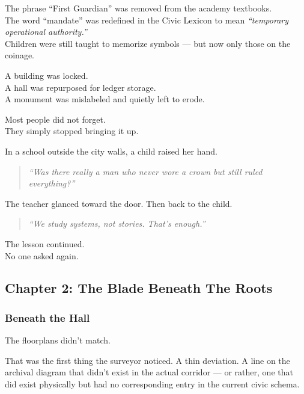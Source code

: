 \documentclass[12pt]{article}
\begin{document}
The phrase ``First Guardian'' was removed from the academy textbooks.\\
The word ``mandate'' was redefined in the Civic Lexicon to mean \textit{“temporary operational authority.”}\\
Children were still taught to memorize symbols --- but now only those on the coinage.

\vspace{1em}

A building was locked.\\
A hall was repurposed for ledger storage.\\
A monument was mislabeled and quietly left to erode.

Most people did not forget.\\
They simply stopped bringing it up.

\vspace{1em}

In a school outside the city walls, a child raised her hand.

\begin{quote}
\textit{“Was there really a man who never wore a crown but still ruled everything?”}
\end{quote}

The teacher glanced toward the door. Then back to the child.

\begin{quote}
\textit{“We study systems, not stories. That’s enough.”}
\end{quote}

The lesson continued.\\
No one asked again.

\newpage

\subsection{Chapter 2: The Blade Beneath The Roots}

\vspace{.5in}

\subsubsection{Beneath the Hall}

The floorplans didn’t match.

That was the first thing the surveyor noticed. A thin deviation. A line on the archival diagram that didn’t exist in the actual corridor --- or rather, one that did exist physically but had no corresponding entry in the current civic schema.
\end{document}
